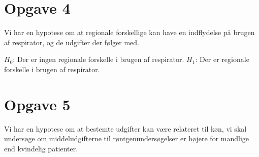 \documentclass{article}
\begin{document}
\section*{Opgave 4}

Vi har en hypotese om at regionale forskellige kan have en indflydelse på brugen
af respirator, og de udgifter der følger med.

$ H_0 $: Der er ingen regionale forskelle i brugen af respirator.
$ H_1 $: Der er regionale forskelle i brugen af respirator.


\section*{Opgave 5}

Vi har en hypotese om at bestemte udgifter kan være relateret til køn, vi skal
undersøge om middeludgifterne til røntgenundersøgelser er højere for mandlige
end kvindelig patienter.


\end{document}
